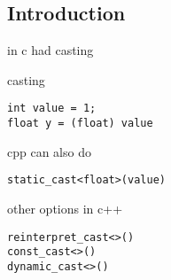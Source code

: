 
\subsection{Introduction}


in c had casting

casting
\begin{verbatim}
int value = 1;
float y = (float) value
\end{verbatim}
cpp can also do
\begin{verbatim}
static_cast<float>(value)
\end{verbatim}


other options in c++
\begin{verbatim}
reinterpret_cast<>()
const_cast<>()
dynamic_cast<>()

\end{verbatim}

